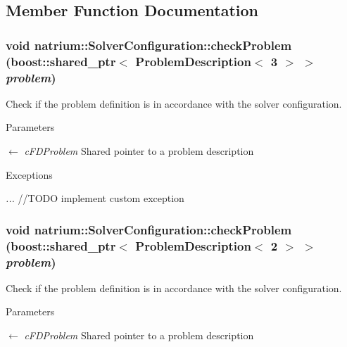 \subsection{Member Function Documentation}
\hypertarget{classnatrium_1_1SolverConfiguration_af841d7ee18a68938be3e207cc8e7f787}{
\subsubsection[{checkProblem}]{\setlength{\rightskip}{0pt plus 5cm}void natrium::SolverConfiguration::checkProblem (boost::shared\_\-ptr$<$ {\bf ProblemDescription}$<$ 3 $>$ $>$ {\em problem})}}
\label{classnatrium_1_1SolverConfiguration_af841d7ee18a68938be3e207cc8e7f787}


Check if the problem definition is in accordance with the solver configuration. 
\begin{DoxyParams}{Parameters}
\item[\mbox{$\leftarrow$} {\em cFDProblem}]Shared pointer to a problem description\end{DoxyParams}

\begin{DoxyExceptions}{Exceptions}
\item[{\em ...}]//TODO implement custom exception \end{DoxyExceptions}
\hypertarget{classnatrium_1_1SolverConfiguration_acc8235baf17f3178be1baf6bd82b35a6}{
\subsubsection[{checkProblem}]{\setlength{\rightskip}{0pt plus 5cm}void natrium::SolverConfiguration::checkProblem (boost::shared\_\-ptr$<$ {\bf ProblemDescription}$<$ 2 $>$ $>$ {\em problem})}}
\label{classnatrium_1_1SolverConfiguration_acc8235baf17f3178be1baf6bd82b35a6}


Check if the problem definition is in accordance with the solver configuration. 
\begin{DoxyParams}{Parameters}
\item[\mbox{$\leftarrow$} {\em cFDProblem}]Shared pointer to a problem description\end{DoxyParams}

